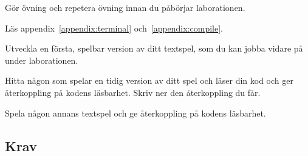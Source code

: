 
\Lab{\LabWeekTHREE}
\begin{Goals}

\end{Goals}

\begin{Preparations}
\item Gör övning \texttt{\ExeWeekTHREE} och repetera övning \texttt{\ExeWeekTWO} innan du påbörjar laborationen.
\item Läs appendix~\ref{appendix:terminal} och~\ref{appendix:compile}.

\item Utveckla en första, spelbar version av ditt textspel, som du kan jobba vidare på under laborationen.
\item Hitta någon som spelar en tidig version av ditt spel och läser din kod och ger återkoppling på kodens läsbarhet. Skriv ner den återkoppling du får.
\item Spela någon annans textspel och ge återkoppling på kodens läsbarhet.
\end{Preparations}


\subsection{Krav}

